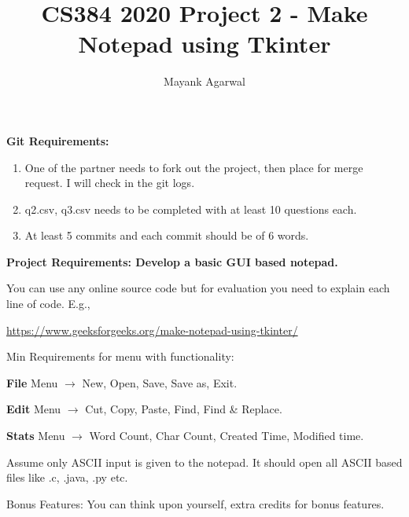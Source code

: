 \documentclass[12pt]{article}
\title{CS384 2020 Project 2 - Make Notepad using Tkinter }
\author{Mayank Agarwal}
\date{}
\begin{document}
{\let\newpage\relax\maketitle} 

\textbf{Git Requirements:}

\begin{enumerate}
	\item One of the partner needs to fork out the project, then place for merge request. I will check in the git logs.
	\item q2.csv, q3.csv needs to be completed with at least 10 questions each. 
	\item At least 5 commits and each commit should be of 6 words.
\end{enumerate}


\textbf{Project Requirements:  Develop a basic GUI based notepad.}


You can use any online source code but for evaluation you need to explain each line of code. E.g.,

 \url{https://www.geeksforgeeks.org/make-notepad-using-tkinter/}

Min Requirements for menu with functionality:

\textbf{File} Menu $ \longrightarrow  $ New, Open, Save, Save as, Exit.


\textbf{Edit} Menu  $ \longrightarrow  $  Cut, Copy, Paste, Find, Find \& Replace.

\textbf{Stats} Menu  $ \longrightarrow  $ Word Count, Char Count, Created Time, Modified time.

Assume only ASCII input is given to the notepad. It should open all ASCII based files like .c, .java, .py
etc.

Bonus Features: You can think upon yourself, extra credits for bonus features. 
\end{document}
